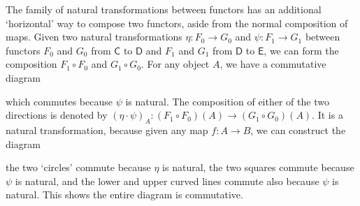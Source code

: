 The family of natural transformations between functors has an additional `horizontal' way to compose two functors, aside from the normal composition of maps. Given two natural transformations $\eta: F_0 \to G_0$ and $\psi: F_1 \to G_1$ between functors $F_0$ and $G_0$ from $\mathsf{C}$ to $\mathsf{D}$ and $F_1$ and $G_1$ from $\mathsf{D}$ to $\mathsf{E}$, we can form the composition $F_1 \circ F_0$ and $G_1 \circ G_0$. For any object $A$, we have a commutative diagram
%
\begin{center}
\end{center}
%
which commutes because $\psi$ is natural. The composition of either of the two directions is denoted by $(\eta \cdot \psi)_A: (F_1 \circ F_0)(A) \to (G_1 \circ G_0)(A)$. It is a natural transformation, because given any map $f: A \to B$, we can construct the diagram
%
\begin{center}
\end{center}
%
the two `circles' commute because $\eta$ is natural, the two squares commute because $\psi$ is natural, and the lower and upper curved lines commute also because $\psi$ is natural. This shows the entire diagram is commutative.

